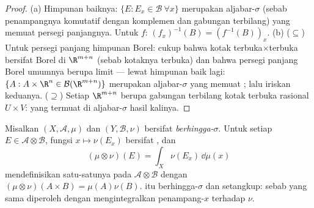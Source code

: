 \begin{proof}
(a) Himpunan baiknya: $\{E : E_x \in \mathcal B\ \forall x\}$ merupakan
aljabar-$\sigma$ (sebab penampangnya komutatif dengan komplemen dan
gabungan terbilang) yang memuat persegi panjangnya. Untuk $f$:
$(f_x)^{-1}(B) = (f^{-1}(B))_x$.
(b) ($\subseteq$) Untuk persegi panjang himpunan Borel: cukup bahwa
kotak terbuka$\times$terbuka bersifat Borel di $\R^{m+n}$ (sebab kotaknya terbuka)
dan bahwa persegi panjang Borel umumnya berupa limit --- lewat himpunan baik
lagi: $\{A : A\times\R^n \in \mathcal B(\R^{m+n})\}$ merupakan
aljabar-$\sigma$ yang memuat ; lalu iriskan keduanya.
($\supseteq$) Setiap  $\R^{m+n}$ berupa gabungan terbilang
kotak terbuka rasional $U\times V$: yang termuat di aljabar-$\sigma$
hasil kalinya.
\end{proof}

\begin{theorem}\label{thm:b3:product:existence}
Misalkan $(X, \mathcal A, \mu)$ dan $(Y, \mathcal B, \nu)$ bersifat
\emph{berhingga-$\sigma$}. Untuk setiap $E \in \mathcal
A\otimes\mathcal B$, fungsi $x \mapsto \nu(E_x)$ bersifat
, dan
\[
(\mu\otimes\nu)(E) = \int_X \nu(E_x)\,\dd\mu(x)
\]
mendefinisikan satu-satunya  pada $\mathcal A\otimes\mathcal B$
dengan $(\mu\otimes\nu)(A\times B) = \mu(A)\nu(B)$.  itu
berhingga-$\sigma$ dan setangkup: sebab  yang sama diperoleh dengan
mengintegralkan penampang-$x$ terhadap $\nu$.
\end{theorem}

